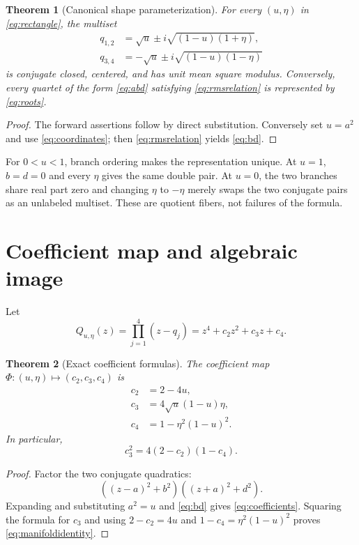\documentclass[12pt]{article}
\newtheorem{theorem}{Theorem}[section]\newtheorem{proposition}[theorem]{Proposition}
\theoremstyle{remark}\newtheorem{remark}[theorem]{Remark}
\begin{document}
\begin{theorem}[Canonical shape parameterization]\label{thm:param}
For every $(u,\eta)$ in \eqref{eq:rectangle}, the multiset
\begin{equation}\label{eq:roots}
 \begin{aligned}
 q_{1,2}&=\sqrt u\pm i\sqrt{(1-u)(1+\eta)},\\
 q_{3,4}&=-\sqrt u\pm i\sqrt{(1-u)(1-\eta)}
 \end{aligned}
\end{equation}
is conjugate closed, centered, and has unit mean square modulus.  Conversely,
every quartet of the form \eqref{eq:abd} satisfying
\eqref{eq:rmsrelation} is represented by \eqref{eq:roots}.
\end{theorem}
\begin{proof}
The forward assertions follow by direct substitution.  Conversely set
$u=a^2$ and use \eqref{eq:coordinates}; then
\eqref{eq:rmsrelation} yields \eqref{eq:bd}.
\end{proof}

For $0<u<1$, branch ordering makes the representation unique.  At $u=1$,
$b=d=0$ and every $\eta$ gives the same double pair.  At $u=0$, the two
branches share real part zero and changing $\eta$ to $-\eta$ merely swaps the
two conjugate pairs as an unlabeled multiset.  These are quotient fibers, not
failures of the formula.

\section{Coefficient map and algebraic image}

Let
\begin{equation}
 Q_{u,\eta}(z)=\prod_{j=1}^{4}(z-q_j)
 =z^4+c_2z^2+c_3z+c_4.
\end{equation}

\begin{theorem}[Exact coefficient formulas]\label{thm:coeff}
The coefficient map $\Phi:(u,\eta)\mapsto(c_2,c_3,c_4)$ is
\begin{equation}\label{eq:coefficients}
 \boxed{
 \begin{aligned}
 c_2&=2-4u,\\
 c_3&=4\sqrt u(1-u)\eta,\\
 c_4&=1-\eta^2(1-u)^2.
 \end{aligned}}
\end{equation}
In particular,
\begin{equation}\label{eq:manifoldidentity}
 \boxed{c_3^2=4(2-c_2)(1-c_4).}
\end{equation}
\end{theorem}
\begin{proof}
Factor the two conjugate quadratics:
\begin{equation}
 ((z-a)^2+b^2)((z+a)^2+d^2).
\end{equation}
Expanding and substituting $a^2=u$ and \eqref{eq:bd} gives
\eqref{eq:coefficients}.  Squaring the formula for $c_3$ and using
$2-c_2=4u$ and $1-c_4=\eta^2(1-u)^2$ proves
\eqref{eq:manifoldidentity}.
\end{proof}
\end{document}
